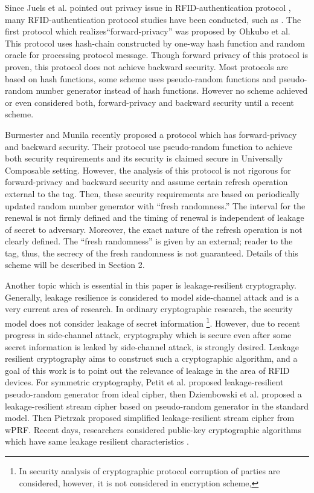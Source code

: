 \documentclass[english]{llncs}
\begin{document}
Since Juels et al. pointed out privacy issue in RFID-authentication
protocol \cite{JP03}, many RFID-authentication protocol studies have
been conducted, such as \cite{OSK03,SWE02,HM04,AO05}.  The first
protocol which realizes``forward-privacy'' was proposed by Ohkubo et
al\cite{OSK03}. This protocol uses hash-chain constructed by one-way
hash function and random oracle for processing protocol message.
Though forward privacy of this protocol is proven, this protocol does
not achieve backward security.  Most protocols are based on hash
functions, some scheme uses pseudo-random functions and pseudo-random
number generator instead of hash functions\cite{BM08,BLM06,LBM07}.
However no scheme achieved or even considered both, forward-privacy and
backward security until a recent scheme.


Burmester and Munila recently proposed a protocol which has
forward-privacy and backward security\cite{BM09}. Their protocol use
pseudo-random function to achieve both security requirements and its
security is claimed secure in Universally Composable setting.
However, the analysis of this protocol is not rigorous for
forward-privacy and backward security and assume certain refresh operation
external to the tag.
Then, these security requirements are based on periodically updated
random number generator with ``fresh randomness.''  The interval for
the renewal is not firmly defined and the timing of renewal is
independent of leakage of secret to adversary. Moreover, the exact
nature of the refresh operation is not clearly defined.  The ``fresh
randomness'' is given by an external; reader to the tag, thus, the
secrecy of the fresh randomness is not guaranteed. Details of this scheme
will be described in Section 2.

%
%

Another topic which is essential in this paper is leakage-resilient
cryptography. Generally, leakage resilience is considered to model
side-channel attack and is a very current area of research. In
ordinary cryptographic research, the security model does not consider
leakage of secret information
\footnote{In security analysis of cryptographic protocol corruption of
  parties are considered, however, it is not considered in encryption
  scheme,}.  
%
 However, due to recent progress in side-channel attack, cryptography
 which is secure even after some secret information is leaked by
 side-channel attack, is strongly desired.  Leakage resilient
 cryptography aims to construct such a cryptographic algorithm, and a
 goal of this work is to point out the relevance of leakage in the
 area of RFID devices.  For symmetric cryptography, Petit et
 al. proposed leakage-resilient pseudo-random generator from ideal
 cipher\cite{PSPMY08}, then Dziembowski et al. proposed a
 leakage-resilient stream cipher based on pseudo-random generator in
 the standard model\cite{DP08}. Then Pietrzak proposed simplified
 leakage-resilient stream cipher from wPRF\cite{P09}.  Recent days,
 researchers considered public-key cryptographic algorithms which have
 same leakage resilient characteristics\cite{ADW09,NS09} .
\end{document}
